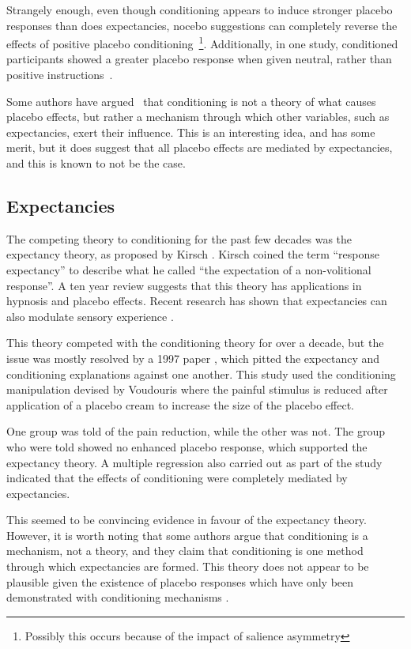Strangely enough, even though conditioning appears to induce stronger placebo responses than does expectancies, nocebo suggestions can completely reverse the effects of positive placebo conditioning~\cite{Benedetti2008}\footnote{Possibly this occurs because of the impact of salience asymmetry}. Additionally, in one study, conditioned participants showed a greater placebo response when given neutral, rather than positive instructions~\cite{Klinger2007a}. 

Some authors have argued~\cite{Stewart-Williams2004b} that conditioning is not a theory of what causes placebo effects, but rather a mechanism through which other variables, such as expectancies, exert their influence. This is an interesting idea, and has some merit, but it does suggest that all placebo effects are mediated by expectancies, and this is known to not be the case. 

\subsection{Expectancies}
\label{sec:expectancies}

The competing theory to conditioning for the past few decades was the expectancy theory, as proposed by Kirsch \cite{Kirsch1985}. Kirsch coined the term ``response expectancy'' to describe what he called ``the expectation of a non-volitional response''. A ten year review \cite{Kirsch1997}  suggests that this theory has applications in hypnosis and placebo effects. Recent research has shown that expectancies can also modulate sensory experience  \cite{Sterzer2008}. 

This theory competed with the conditioning theory for over a decade, but the issue was mostly resolved by a 1997 paper \cite{Montgomery1997}, which pitted the expectancy and conditioning explanations against one another. This study used the conditioning manipulation devised by Voudouris \cite{Voudouris1985} where the painful stimulus is reduced after application of a placebo cream to increase the size of the placebo effect. 

One group was told of the pain reduction, while the other was not. The group who were told showed no enhanced placebo response, which supported the expectancy theory. A multiple regression also carried out as part of the study indicated that the effects of conditioning were completely mediated by expectancies. 

This seemed to be convincing evidence in favour of the expectancy theory. However, it is worth noting that some authors \cite{Stewart-Williams2004a}  argue that conditioning is a mechanism, not a theory, and they claim that conditioning is one method through which expectancies are formed. This theory does not appear to be plausible given the existence of placebo responses which have only been demonstrated with conditioning mechanisms \cite{benedetti2003a}.   

